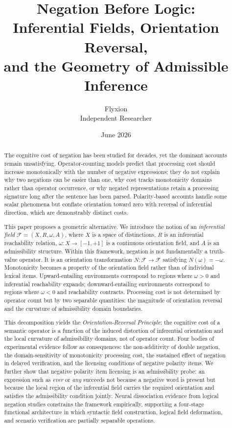 \documentclass[12pt]{article}
\title{Negation Before Logic:\\
Inferential Fields, Orientation Reversal,\\
and the Geometry of Admissible Inference}
\author{Flyxion\\
\small Independent Researcher}
\date{June 2026}
\theoremstyle{remark}
\begin{document}
\maketitle

\begin{abstract}
The cognitive cost of negation has been studied for decades, yet the 
dominant accounts remain unsatisfying. Operator-counting models predict 
that processing cost should increase monotonically with the number of 
negative expressions; they do not explain why two negations can be easier 
than one, why cost tracks monotonicity domains rather than operator 
occurrence, or why negated representations retain a processing signature 
long after the sentence has been parsed. Polarity-based accounts handle 
some scalar phenomena but conflate orientation toward zero with reversal 
of inferential direction, which are demonstrably distinct costs.

This paper proposes a geometric alternative. We introduce the notion of 
an \emph{inferential field} $\mathcal{F} = (X, R, \omega, A)$, where $X$ 
is a space of distinctions, $R$ is an inferential reachability relation, 
$\omega : X \to [-1,+1]$ is a continuous orientation field, and $A$ is an 
admissibility structure. Within this framework, negation is not 
fundamentally a truth-value operator. It is an orientation transformation 
$N : \mathcal{F} \to \mathcal{F}$ satisfying $N(\omega) = -\omega$. 
Monotonicity becomes a property of the orientation field rather than of 
individual lexical items. Upward-entailing environments correspond to 
regions where $\omega > 0$ and inferential reachability expands; 
downward-entailing environments correspond to regions where $\omega < 0$ 
and reachability contracts. Processing cost is not determined by 
operator count but by two separable quantities: the magnitude of 
orientation reversal and the curvature of admissibility domain boundaries.

This decomposition yields the \emph{Orientation-Reversal Principle}: the 
cognitive cost of a semantic operator is a function of the induced 
distortion of inferential orientation and the local curvature of 
admissibility domains, not of operator count. Four bodies of experimental 
evidence follow as consequences: the non-additivity of double negation, 
the domain-sensitivity of monotonicity processing cost, the sustained 
effect of negation in delayed verification, and the licensing conditions 
of negative polarity items. We further show that negative polarity item 
licensing is an admissibility probe: an expression such as \emph{ever} or 
\emph{any} succeeds not because a negative word is present but because 
the local region of the inferential field carries the required orientation 
and satisfies the admissibility condition jointly. Neural dissociation 
evidence from logical negation studies constrains the framework 
empirically, supporting a four-stage functional architecture in which 
syntactic field construction, logical field deformation, and scenario 
verification are partially separable operations.


\end{abstract}
\end{document}
